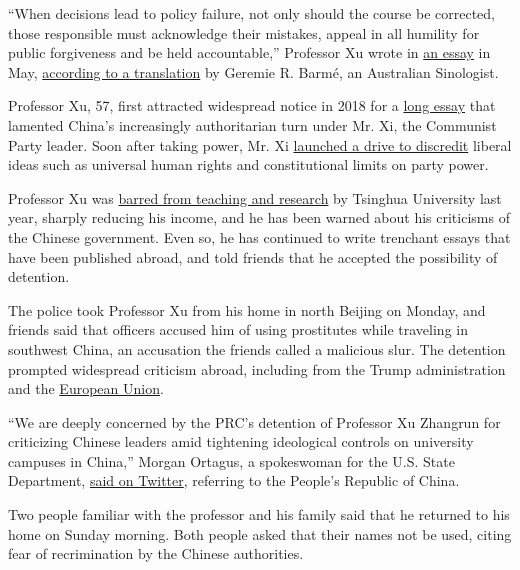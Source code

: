 ``When decisions lead to policy failure, not only should the course be
corrected, those responsible must acknowledge their mistakes, appeal in
all humility for public forgiveness and be held accountable,'' Professor
Xu wrote in
\href{https://www.chinese-future.org/articles/6j3ywr3swgp3flagdlbk3xd2wkmjcj}{an
essay} in May,
\href{http://chinaheritage.net/journal/remonstrating-with-beijing-xu-zhangruns-advice-to-chinas-national-peoples-congress-21-may-2020/}{according
to a translation} by Geremie R. Barmé, an Australian Sinologist.

Professor Xu, 57, first attracted widespread notice in 2018 for a
\href{http://chinaheritage.net/journal/imminent-fears-immediate-hopes-a-beijing-jeremiad/}{long
essay} that lamented China's increasingly authoritarian turn under Mr.
Xi, the Communist Party leader. Soon after taking power, Mr. Xi
\href{https://www.nytimes.com/2013/08/20/world/asia/chinas-new-leadership-takes-hard-line-in-secret-memo.html}{launched
a drive to discredit} liberal ideas such as universal human rights and
constitutional limits on party power.

Professor Xu was
\href{https://www.nytimes.com/2019/03/26/world/asia/chinese-law-professor-xi.html}{barred
from teaching and research} by Tsinghua University last year, sharply
reducing his income, and he has been warned about his criticisms of the
Chinese government. Even so, he has continued to write trenchant essays
that have been published abroad, and told friends that he accepted the
possibility of detention.

The police took Professor Xu from his home in north Beijing on Monday,
and friends said that officers accused him of using prostitutes while
traveling in southwest China, an accusation the friends called a
malicious slur. The detention prompted widespread criticism abroad,
including from the Trump administration and the
\href{https://eeas.europa.eu/headquarters/headquarters-homepage/82435/china-statement-spokesperson-5th-anniversary-\%E2\%80\%9C709-crackdown\%E2\%80\%9D-human-rights-lawyers-and_en}{European
Union}.

``We are deeply concerned by the PRC's detention of Professor Xu
Zhangrun for criticizing Chinese leaders amid tightening ideological
controls on university campuses in China,'' Morgan Ortagus, a
spokeswoman for the U.S. State Department,
\href{https://twitter.com/statedeptspox/status/1280529327826837504}{said
on Twitter}, referring to the People's Republic of China.

Two people familiar with the professor and his family said that he
returned to his home on Sunday morning. Both people asked that their
names not be used, citing fear of recrimination by the Chinese
authorities.

